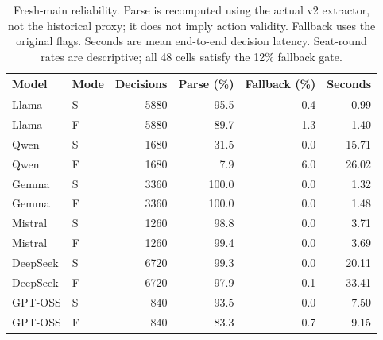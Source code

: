\begin{table}[t]
\centering
\small
\setlength{\tabcolsep}{4pt}
\begin{tabular}{llrrrr}
\toprule
Model & Mode & Decisions & Parse (\%) & Fallback (\%) & Seconds \\
\midrule
Llama & S & 5880 & 95.5 & 0.4 & 0.99 \\
Llama & F & 5880 & 89.7 & 1.3 & 1.40 \\
Qwen & S & 1680 & 31.5 & 0.0 & 15.71 \\
Qwen & F & 1680 & 7.9 & 6.0 & 26.02 \\
Gemma & S & 3360 & 100.0 & 0.0 & 1.32 \\
Gemma & F & 3360 & 100.0 & 0.0 & 1.48 \\
Mistral & S & 1260 & 98.8 & 0.0 & 3.71 \\
Mistral & F & 1260 & 99.4 & 0.0 & 3.69 \\
DeepSeek & S & 6720 & 99.3 & 0.0 & 20.11 \\
DeepSeek & F & 6720 & 97.9 & 0.1 & 33.41 \\
GPT-OSS & S & 840 & 93.5 & 0.0 & 7.50 \\
GPT-OSS & F & 840 & 83.3 & 0.7 & 9.15 \\
\bottomrule
\end{tabular}
\caption{Fresh-main reliability. Parse is recomputed using the actual v2 extractor, not the historical proxy; it does not imply action validity. Fallback uses the original flags. Seconds are mean end-to-end decision latency. Seat-round rates are descriptive; all 48 cells satisfy the 12\% fallback gate.}
\label{tab:main-reliability}
\end{table}

